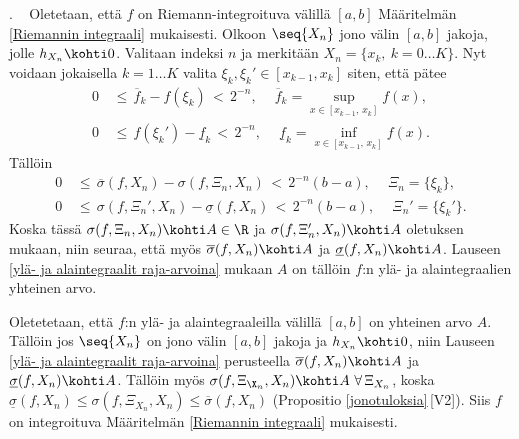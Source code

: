 . \ \fbox{$\impl$} Oletetaan, että $f$ on
Riemann-integroituva välillä $[a,b]$ Määritelmän \ref{Riemannin integraali} mukaisesti. Olkoon
$\seq{X_n}$ jono välin $[a,b]$ jakoja, jolle $h_{X_n} \kohti 0$. Valitaan indeksi $n$ ja
merkitään $X_n = \{x_k,\ k = 0 \ldots K\}$. Nyt voidaan jokaisella $k = 1 \ldots K$ valita
$\xi_k,\xi_k'\in[x_{k-1},x_k]$ siten, että pätee
\begin{align*}
0\,&\le\,\overline{f}_k-f(\xi_k)\,<\,2^{-n}, \quad\ 
                \overline{f}_k=\sup_{x\in[x_{k-1},\,x_k]} f(x), \\
0\,&\le\,f(\xi_k')-\underline{f}_k\,<\,2^{-n}, \quad\ 
                \underline{f}_k=\inf_{x\in[x_{k-1},\,x_k]} f(x).
\end{align*}
Tällöin
\begin{align*}
0\,&\le\,\overline{\sigma}(f,X_n)-\sigma(f,\Xi_n,X_n)\,
                                <\,2^{-n}(b-a), \quad\ \Xi_n=\{\xi_k\}, \\
0\,&\le\,\sigma(f,\Xi_n',X_n)-\underline{\sigma}(f,X_n)\,
                                <\,2^{-n}(b-a), \quad\ \Xi_n'=\{\xi_k'\}.
\end{align*}
Koska tässä $\sigma(f,\Xi_n,X_n) \kohti A\in\R$ ja $\sigma(f,\Xi_n',X_n) \kohti A$ oletuksen
mukaan, niin seuraa, että myös $\overline{\sigma}(f,X_n) \kohti A$ ja 
$\underline{\sigma}(f,X_n) \kohti A$. Lauseen \ref{ylä- ja alaintegraalit raja-arvoina} mukaan
$A$ on tällöin $f$:n ylä- ja alaintegraalien yhteinen arvo.

\fbox{$\Leftarrow$} Oletetetaan, että $f$:n ylä- ja alaintegraaleilla välillä $[a,b]$ on
yhteinen arvo $A$. Tällöin jos $\seq{X_n}$ on jono välin $[a,b]$ jakoja ja $h_{X_n} \kohti 0$,
niin Lauseen \ref{ylä- ja alaintegraalit raja-arvoina} perusteella 
$\overline{\sigma}(f,X_n) \kohti A$ ja $\underline{\sigma}(f,X_n) \kohti A$. Tällöin myös 
$\sigma(f,\Xi_{\X_n},X_n) \kohti A\ \forall\,\Xi_{X_n}$, koska 
$\underline{\sigma}(f,X_n)\le\sigma(f,\Xi_{X_n},X_n)\le\overline{\sigma}(f,X_n)$
(Propositio \ref{jonotuloksia}\,[V2]). Siis $f$ on integroituva Määritelmän
\ref{Riemannin integraali} mukaisesti. \loppu

